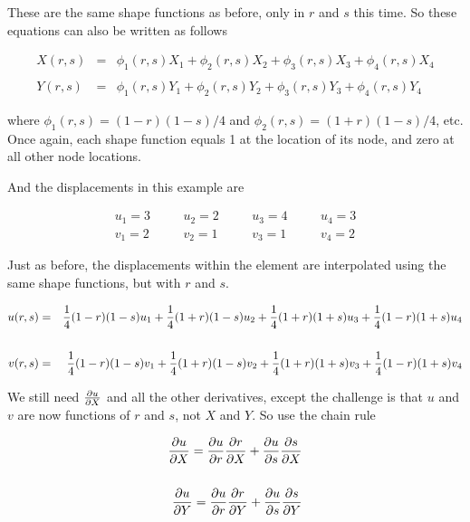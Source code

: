These are the same shape functions as before, only in $ r $ and $ s $ this time. So these equations can also be written as follows

\begin{eqnarray*}
X(r,s) & = & \phi_1(r,s) X_1 +  \phi_2(r,s) X_2 +  \phi_3(r,s) X_3 +  \phi_4(r,s) X_4
\\
\\
Y(r,s) & = & \phi_1(r,s) Y_1 +  \phi_2(r,s) Y_2 +  \phi_3(r,s) Y_3 +  \phi_4(r,s) Y_4
\end{eqnarray*}

where $ \phi_1(r,s) = (1 - r)(1 - s)/4 $ and $ \phi_2(r,s) = (1 + r)(1 - s)/4 $, etc. Once again, each shape function equals 1 at the location of its node, and zero at all other node locations.

And the displacements in this example are

\begin{align*}
u_1 = 3  & \quad & u_2 = 2 & \quad & u_3 = 4 & \quad & u_4 = 3 \\
v_1 = 2  & \quad & v_2 = 1 & \quad & v_3 = 1 & \quad & v_4 = 2
\end{align*}

Just as before, the displacements within the element are interpolated using the same shape functions, but with $ r $ and $ s $.

\begin{eqnarray*}
u(r,s) & = & {1\over 4}(1-r)(1-s)u_1 + {1\over 4}(1+r)(1-s)u_2 + {1\over 4}(1+r)(1+s)u_3 + {1\over 4}(1-r)(1+s)u_4 \\
\\
v(r,s) & = & {1\over 4}(1-r)(1-s)v_1 + {1\over 4}(1+r)(1-s)v_2 + {1\over 4}(1+r)(1+s)v_3 + {1\over 4}(1-r)(1+s)v_4 \\
\end{eqnarray*}

We still need $ {\partial u \over \partial X} $ and all the other derivatives, except the challenge is that $ u $ and $ v $ are now functions of $ r $ and $ s $, not $ X $ and $ Y $.  So use the chain rule

\begin{eqnarray*}
{\partial u \over \partial X} = {\partial u \over \partial r} {\partial r \over \partial X} + {\partial u \over \partial s} {\partial s \over \partial X} \\
\\
{\partial u \over \partial Y} = {\partial u \over \partial r} {\partial r \over \partial Y} + {\partial u \over \partial s} {\partial s \over \partial Y}
\end{eqnarray*}

